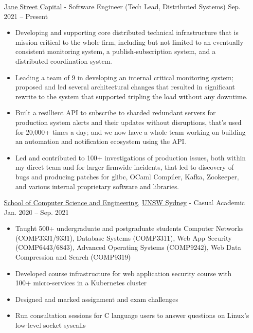 \documentclass[hidelinks__VERSION__]{adamyi-cv}
\begin{document}
\begin{entrylist}

\entry
{\href{https://www.janestreet.com/}{Jane Street Capital} - Software Engineer (Tech Lead, Distributed Systems)}
{Sep. 2021 -- Present}
{
\begin{minipage}[t]{1\linewidth}
\begin{itemize}[leftmargin=*,align=left,noitemsep]
\item Developing and supporting core distributed technical infrastructure that is mission-critical to the whole firm, including but not limited to an eventually-consistent monitoring system, a publish-subscription system, and a distributed coordination system.
\item Leading a team of 9 in developing an internal critical monitoring system; proposed and led several architectural changes that resulted in significant rewrite to the system that supported tripling the load without any downtime.
\item Built a resillient API to subscribe to sharded redundant servers for production system alerts and their updates without disruptions, that's used for 20,000+ times a day; and we now have a whole team working on building an automation and notification ecosystem using the API.
\item Led and contributed to 100+ investigations of production issues, both within my direct team and for larger firmwide incidents, that led to discovery of bugs and producing patches for glibc, OCaml Compiler, Kafka, Zookeeper, and various internal proprietary software and libraries.
\end{itemize}
\end{minipage}
}


\entry
{\href{https://www.cse.unsw.edu.au/}{School of Computer Science and Engineering}, \href{https://unsw.edu.au/}{UNSW Sydney} - Casual Academic}
{Jan. 2020 -- Sep. 2021}
{
\begin{minipage}[t]{1\linewidth}
\begin{itemize}[leftmargin=*,align=left,noitemsep]
\item Taught 500+ undergraduate and postgraduate students Computer Networks (COMP3331/9331), Database Systems (COMP3311), Web App Security (COMP6443/6843), Advanced Operating Systems (COMP9242), Web Data Compression and Search (COMP9319)
\item Developed course infrastructure for web application security course with 100+ micro-services in a Kubernetes cluster
\item Designed and marked assignment and exam challenges
\item Run consultation sessions for C language users to answer questions on Linux's low-level socket syscalls
\end{itemize}
\end{minipage}
}


\end{entrylist}
\end{document}
